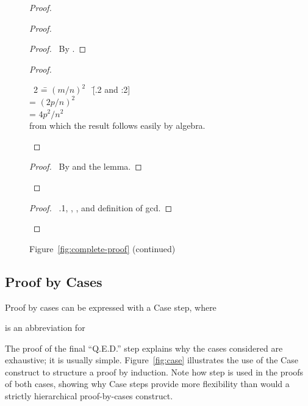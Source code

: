 \begin{figure}[tp]
\small
\begin{proof}

\begin{proof}
  \begin{proof}
    \pf\ By .  
  \end{proof}

  \begin{proof}
    \begin{tabbing}
      \pf\ 2 \= = $(m/n)^{2}$  \  \= [.2 and \toplevel:2]\\
             \> = $(2p/n)^{2}$    \> [\stepref{3.1}] \\
             \> = $4p^{2}/n^{2}$  \> [Algebra]\\
      from which the result follows easily by algebra.
    \end{tabbing}
  \end{proof}

  \qedstep
  \begin{proof}
    \pf\ By  and the lemma.
  \end{proof}
\end{proof} %
\qedstep
\begin{proof}
  \pf\ .1, , , and definition of gcd.
\end{proof}

\end{proof}
\normalsize
\begin{center}
Figure~\ref{fig:complete-proof} (continued)
\end{center}
\end{figure}



\subsection{Proof by Cases}

Proof by cases can be expressed with a 
{\sc Case} step, where
\begin{quote}\small
{}
\end{quote}
is an abbreviation for
\begin{quote}\small
{}
\end{quote}
The proof of the final ``Q.E.D.'' step explains why the cases
considered are exhaustive; it is usually simple.
Figure~\ref{fig:case} illustrates the use of the {\sc Case} construct
to structure a proof by induction.  Note how step
 is used in the proofs of both cases, showing
why {\sc Case} steps provide more flexibility than would a strictly
hierarchical proof-by-cases construct.

